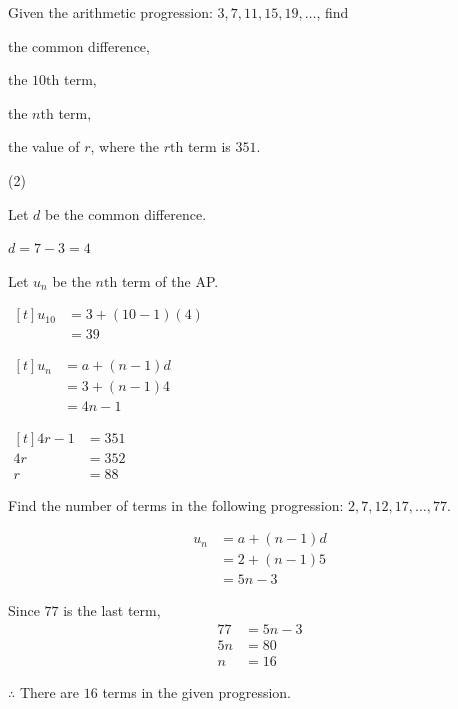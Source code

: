 \documentclass[11pt,a4paper]{book}
\begin{document}
\begin{example}


Given the arithmetic progression: $3,7,11,15,19,\ldots$, find

\begin{tasks}[label=(\alph*),label-width=3.5ex]

\task  the common difference,

\task  the $10\text{th}$ term,

\task  the $n\text{th}$ term,

\task  the value of $r$, where the $r\text{th}$ term is $351$.

\end{tasks}

\Solution

\begin{tasks}[label=(\alph*),label-width=3.5ex] (2)

\task Let $d$ be the common difference.

$d=7-3=4$

\task  Let $u_{n}$ be the $n\text{th}$ term of the AP.

$
\begin{aligned}[t]
u_{10} & =3+\left(10-1\right)\left(4\right)\\
 & =39
\end{aligned}
$

\task
$
\begin{aligned}[t]
u_{n} & =a+\left(n-1\right)d\\
 & =3+\left(n-1\right)4\\
 & =4n-1
\end{aligned}
$


\task
$
\begin{aligned}[t]
4r-1 & =351\\
4r & =352\\
r & =88
\end{aligned}
$


\end{tasks}

\end{example}

\begin{example}

Find the number of terms in the following progression: $2,7,12,17,\ldots,77$.

\Solution

\begin{align*}
u_{n} & =a+\left(n-1\right)d\\
 & =2+\left(n-1\right)5\\
 & =5n-3
\end{align*}

Since $77$ is the last term,
\begin{align*}
77 & =5n-3\\
5n & =80\\
n & =16
\end{align*}

$\therefore$ There are $16$ terms in the given progression.

\end{example}
\end{document}
